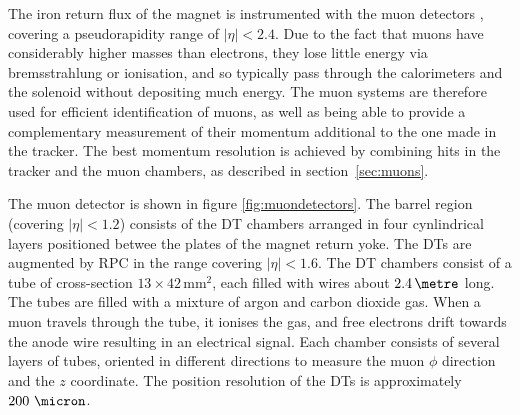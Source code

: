 The iron return flux of the magnet is instrumented with the muon detectors
\cite{Chatrchyan:2008aa}, covering a pseudorapidity range of $|\eta|<2.4$. Due
to the fact that muons have considerably higher masses than electrons, they lose
little energy via bremsstrahlung or ionisation, and so typically pass through
the calorimeters and the solenoid without depositing much energy. The muon
systems are therefore used for efficient identification of muons, as well as
being able to provide a complementary measurement of their momentum additional
to the one made in the tracker. The best momentum resolution is achieved by 
combining hits in the tracker and the muon chambers, as described in section~\ref{sec:muons}. 

The muon detector is shown in figure \ref{fig:muondetectors}. The barrel region
(covering $|\eta|<1.2$) consists of the \ac{DT} chambers arranged in four
cynlindrical layers positioned betwee the plates of the magnet return yoke. The
\ac{DT}s are augmented by \ac{RPC} in the range covering $|\eta|<1.6$. The
\ac{DT} chambers consist of a tube of cross-section $13\times42\,\text{mm}^{2}$,
each filled with wires about $2.4\,\metre$ long. The tubes are filled with a
mixture of argon and carbon dioxide gas. When a muon travels through the tube,
it ionises the gas, and free electrons drift towards the anode wire resulting in
an electrical signal. Each chamber consists of several layers of tubes, oriented
in different directions to measure the muon $\phi$ direction and the $z$
coordinate. The position resolution of the \ac{DT}s is approximately
$200~\micron$.

